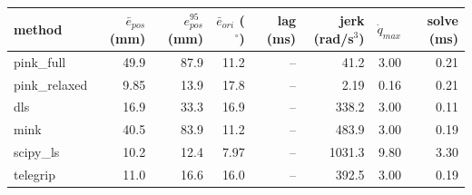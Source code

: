 \begin{tabular}{lrrrrrrr}
\toprule
method & $\bar{e}_{pos}$ (mm) & $e_{pos}^{95}$ (mm) & $\bar{e}_{ori}$ ($^\circ$) & lag (ms) & jerk (rad/s$^3$) & $\dot{q}_{max}$ & solve (ms) \\
\midrule
pink\_full & 49.9 & 87.9 & 11.2 & -- & 41.2 & 3.00 & 0.21 \\
pink\_relaxed & 9.85 & 13.9 & 17.8 & -- & 2.19 & 0.16 & 0.21 \\
dls & 16.9 & 33.3 & 16.9 & -- & 338.2 & 3.00 & 0.11 \\
mink & 40.5 & 83.9 & 11.2 & -- & 483.9 & 3.00 & 0.19 \\
scipy\_ls & 10.2 & 12.4 & 7.97 & -- & 1031.3 & 9.80 & 3.30 \\
telegrip & 11.0 & 16.6 & 16.0 & -- & 392.5 & 3.00 & 0.19 \\
\bottomrule
\end{tabular}

